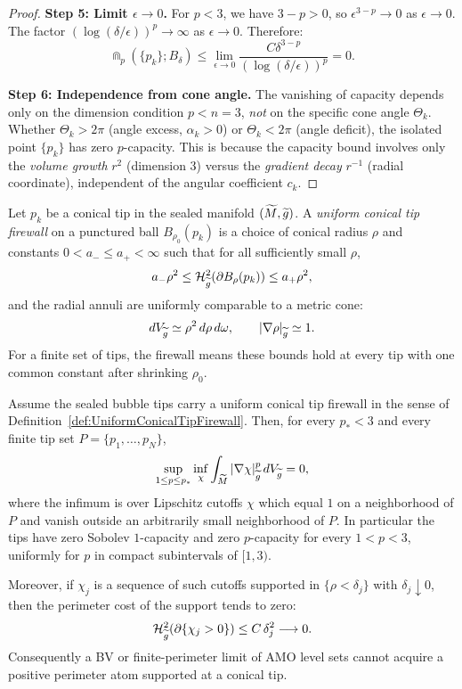 \begin{proof}
\textbf{Step 5: Limit $\epsilon \to 0$.}
For $p < 3$, we have $3 - p > 0$, so $\epsilon^{3-p} \to 0$ as $\epsilon \to 0$. The factor $(\log(\delta/\epsilon))^p \to \infty$ as $\epsilon \to 0$. Therefore:
\begin{equation}
    \Cap_p(\{p_k\}; B_\delta) \le \lim_{\epsilon \to 0} \frac{C \delta^{3-p}}{(\log(\delta/\epsilon))^p} = 0.
\end{equation}

\textbf{Step 6: Independence from cone angle.}
The vanishing of capacity depends only on the dimension condition $p < n = 3$, \emph{not} on the specific cone angle $\Theta_k$. Whether $\Theta_k > 2\pi$ (angle excess, $\alpha_k > 0$) or $\Theta_k < 2\pi$ (angle deficit), the isolated point $\{p_k\}$ has zero $p$-capacity. This is because the capacity bound involves only the \emph{volume growth} $r^2$ (dimension 3) versus the \emph{gradient decay} $r^{-1}$ (radial coordinate), independent of the angular coefficient $c_k$.
\end{proof}

\begin{definition}\label{def:UniformConicalTipFirewall}
Let $p_k$ be a conical tip in the sealed manifold $(\widetilde{M},\widetilde{g})$.  A
\emph{uniform conical tip firewall} on a punctured ball $B_{\rho_0}(p_k)$ is a
choice of conical radius $\rho$ and constants $0<a_-\le a_+<\infty$ such that
for all sufficiently small $\rho$,
\[
    a_-\rho^2
    \le
    \mathcal H^2_{\widetilde{g}}(\partial B_\rho(p_k))
    \le
    a_+\rho^2,
\]
and the radial annuli are uniformly comparable to a metric cone:
\[
    dV_{\widetilde{g}}\simeq \rho^2\,d\rho\,d\omega,
    \qquad
    |\nabla \rho|_{\widetilde{g}}\simeq1 .
\]
For a finite set of tips, the firewall means these bounds hold at every tip
with one common constant after shrinking $\rho_0$.
\end{definition}

\begin{theorem}\label{thm:UniformPToOneConicalCapacityFirewall}
Assume the sealed bubble tips carry a uniform conical tip firewall in the sense
of Definition~\ref{def:UniformConicalTipFirewall}.  Then, for every
$p_*<3$ and every finite tip set $P=\{p_1,\ldots,p_N\}$,
\[
    \sup_{1\le p\le p_*}
    \inf_{\chi}
    \int_{\widetilde{M}}|\nabla\chi|_{\widetilde{g}}^{p}\,dV_{\widetilde{g}}
    =
    0,
\]
where the infimum is over Lipschitz cutoffs $\chi$ which equal $1$ on a
neighborhood of $P$ and vanish outside an arbitrarily small neighborhood of
$P$.  In particular the tips have zero Sobolev \(1\)-capacity and zero
\(p\)-capacity for every \(1<p<3\), uniformly for \(p\) in compact subintervals
of \([1,3)\).

Moreover, if $\chi_j$ is a sequence of such cutoffs supported in
$\{\rho<\delta_j\}$ with $\delta_j\downarrow0$, then the perimeter cost of the
support tends to zero:
\[
    \mathcal H^2_{\widetilde{g}}(\partial\{\chi_j>0\})
    \le
    C\,\delta_j^2
    \longrightarrow0 .
\]
Consequently a BV or finite-perimeter limit of AMO level sets cannot acquire a
positive perimeter atom supported at a conical tip.
\end{theorem}

